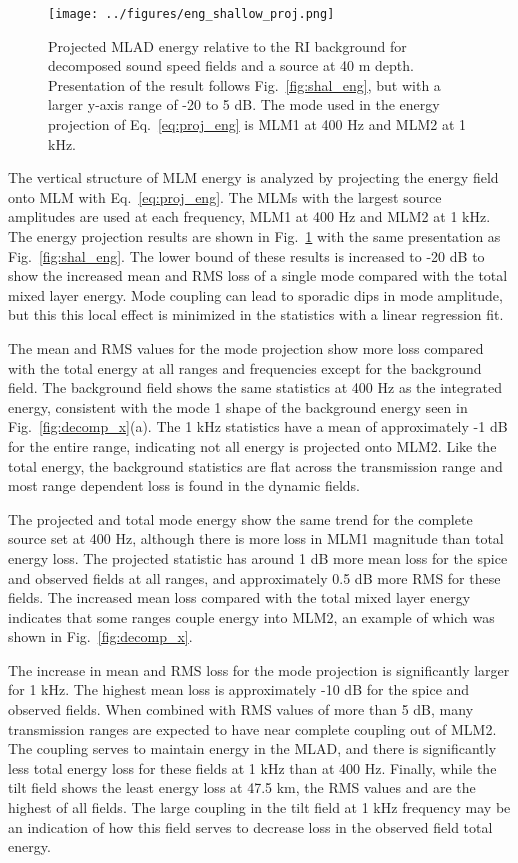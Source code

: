 \documentclass[preprint,NumberedRefs]{JASA}
\begin{document}
\begin{figure}
\texttt{[image: ../figures/eng\_shallow\_proj.png]}
    \caption{Projected MLAD energy relative to the RI background for decomposed sound speed fields and a source at 40 m depth. Presentation of the result follows Fig.~\ref{fig:shal_eng}, but with a larger y-axis range of -20 to 5 dB. The mode used in the energy projection of Eq.~\eqref{eq:proj_eng} is MLM1 at 400 Hz and MLM2 at 1 kHz.}
    \label{fig:shal_proj}
\end{figure}
The vertical structure of MLM energy is analyzed by projecting the energy field onto MLM with Eq.~\eqref{eq:proj_eng}. The MLMs with the largest source amplitudes are used at each frequency, MLM1 at 400 Hz and MLM2 at 1 kHz. The energy projection results are shown in Fig.~\ref{fig:shal_proj} with the same presentation as Fig.~\ref{fig:shal_eng}. The lower bound of these results is increased to -20 dB to show the increased mean and RMS loss of a single mode compared with the total mixed layer energy. Mode coupling can lead to sporadic dips in mode amplitude, but this this local effect is minimized in the statistics with a linear regression fit.

The mean and RMS values for the mode projection show more loss compared with the total energy at all ranges and frequencies except for the background field. The background field shows the same statistics at 400 Hz as the integrated energy, consistent with the mode 1 shape of the background energy seen in Fig.~\ref{fig:decomp_x}(a). The 1 kHz statistics have a mean of approximately -1 dB for the entire range, indicating not all energy is projected onto MLM2. Like the total energy, the background statistics are flat across the transmission range and most range dependent loss is found in the dynamic fields.

The projected and total mode energy show the same trend for the complete source set at 400 Hz, although there is more loss in MLM1 magnitude than total energy loss. The projected statistic has around 1 dB more mean loss for the spice and observed fields at all ranges, and approximately 0.5 dB more RMS for these fields. The increased mean loss compared with the total mixed layer energy indicates that some ranges couple energy into MLM2, an example of which was shown in Fig.~\ref{fig:decomp_x}.

The increase in mean and RMS loss for the mode projection is significantly larger for 1 kHz. The highest mean loss is approximately -10 dB for the spice and observed fields. When combined with RMS values of more than 5 dB, many transmission ranges are expected to have near complete coupling out of MLM2. The coupling serves to maintain energy in the MLAD, and there is significantly less total energy loss for these fields at 1 kHz than at 400 Hz. Finally, while the tilt field shows the least energy loss at 47.5 km, the RMS values and are the highest of all fields. The large coupling in the tilt field at 1 kHz frequency may be an indication of how this field serves to decrease loss in the observed field total energy.
\end{document}
